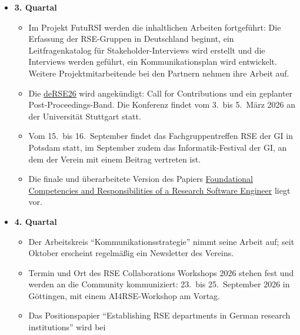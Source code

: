 \begin{itemize}
\begin{itemize}
      Committee wird vorbereitet.
    \item Der Arbeitskreis "`Kategorien von Forschungssoftware"' veröffentlicht seine Arbeit als
      \href{https://doi.org/10.1109/MCSE.2025.3555023}{\glqq Multi-Dimensional Research Software
      Categorization\grqq}.
    \item Der Vorstand trifft sich am 20.~Juni zu einer Sitzung in Präsenz in Braunschweig.
   \end{itemize}
 \item[] \textbf{3. Quartal}
   \begin{itemize}
    \item Im Projekt FutuRSI werden die inhaltlichen Arbeiten fortgeführt: Die Erfassung der
      RSE-Gruppen in Deutschland beginnt, ein Leitfragenkatalog für Stakeholder-Interviews wird
      erstellt und die Interviews werden geführt, ein Kommunikationsplan wird entwickelt. Weitere
      Projektmitarbeitende bei den Partnern nehmen ihre Arbeit auf.
    \item Die \href{https://de-rse.org/blog/2025/09/22/deRSE26-call-for-contribution.html}{deRSE26}
      wird angekündigt: Call for Contributions und ein geplanter Post-Proceedings-Band. Die Konferenz
      findet vom 3.\ bis 5.~März 2026 an der Universität Stuttgart statt.
    \item Vom 15.\ bis 16.~September findet das Fachgruppentreffen RSE der GI in Potsdam statt, im
      September zudem das Informatik-Festival der GI, an dem der Verein mit einem Beitrag vertreten
      ist.
    \item Die finale und überarbeitete Version des Papiers
      \href{https://doi.org/10.12688/f1000research.157778.2}{\glqq Foundational Competencies and
      Responsibilities of a Research Software Engineer\grqq} liegt vor.
   \end{itemize}
\clearpage
 \item[] \textbf{4. Quartal}
   \begin{itemize}
    \item Der Arbeitskreis "`Kommunikationsstrategie"' nimmt seine Arbeit auf; seit Oktober erscheint
      regelmäßig ein Newsletter des Vereins.
    \item Termin und Ort des RSE Collaborations Workshops 2026 stehen fest und werden an die Community
      kommuniziert: 23.\ bis 25.~September 2026 in Göttingen, mit einem AI4RSE-Workshop am Vortag.
    \item Das Positionspapier "`Establishing RSE departments in German research institutions"' wird bei

\end{itemize}
\end{itemize}
